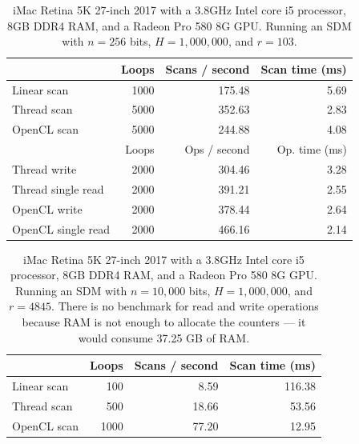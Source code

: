 \begin{table}[!htb]
\centering
\begin{tabular}{| l | r | r | r |}
    \hline
    & Loops & Scans / second & Scan time (ms) \\ \hline
    Linear scan & 1000 & 175.48 & 5.69 \\
    Thread scan & 5000 & 352.63 & 2.83 \\
    OpenCL scan & 5000 & 244.88 & 4.08 \\ \hline
    \hline
    & Loops & Ops / second & Op. time (ms) \\ \hline
    Thread write & 2000 & 304.46 & 3.28 \\
    Thread single read & 2000 & 391.21 & 2.55 \\
    OpenCL write & 2000 & 378.44 & 2.64 \\
    OpenCL single read & 2000 & 466.16 & 2.14 \\
    \hline
\end{tabular}
\caption{iMac Retina 5K 27-inch 2017 with a 3.8GHz Intel core i5 processor, 8GB DDR4 RAM, and a Radeon Pro 580 8G GPU. Running an SDM with $n=256$ bits, $H=1,000,000$, and $r=103$.
\label{tab:perf-imac-256}}
\end{table}

\begin{table}[!htb]
\centering
\begin{tabular}{| l | r | r | r |}
    \hline
    & Loops & Scans / second & Scan time (ms) \\ \hline
    Linear scan & 100 & 8.59 & 116.38 \\
    Thread scan & 500 & 18.66 & 53.56 \\
    OpenCL scan & 1000 & 77.20 & 12.95 \\
    \hline
\end{tabular}
\caption{iMac Retina 5K 27-inch 2017 with a 3.8GHz Intel core i5 processor, 8GB DDR4 RAM, and a Radeon Pro 580 8G GPU. Running an SDM with $n=10,000$ bits, $H=1,000,000$, and $r=4845$.  There is no benchmark for read and write operations because RAM is not enough to allocate the counters --- it would consume 37.25 GB of RAM.
\label{tab:perf-imac-10k}}
\end{table}

